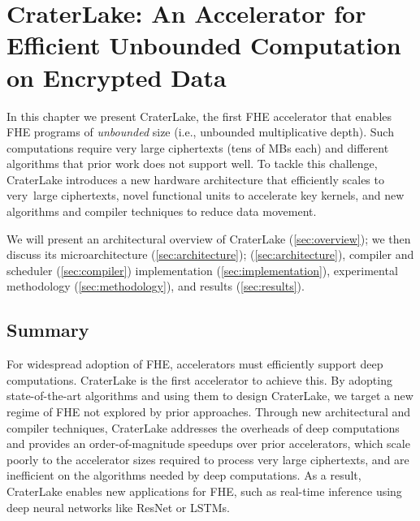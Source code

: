 \documentclass[12pt,twoside]{mitthesis}
\begin{document}
\chapter{CraterLake: An Accelerator for Efficient Unbounded Computation on Encrypted Data}\label{ch:craterlake}

In this chapter we present CraterLake, the first FHE accelerator that enables
FHE programs of \emph{unbounded} size (i.e., unbounded multiplicative depth).
Such computations require very large ciphertexts (tens of MBs each) and
different algorithms that prior work does not support well. To tackle this
challenge, CraterLake introduces a new hardware architecture that efficiently
scales to very~large ciphertexts, novel functional units to accelerate key
kernels, and new algorithms and compiler techniques to reduce data movement.

We will present an architectural overview of CraterLake
(\autoref{sec:overview}); we then discuss its microarchitecture
(\autoref{sec:architecture}); (\autoref{sec:architecture}), compiler and
scheduler (\autoref{sec:compiler}) implementation
(\autoref{sec:implementation}), experimental methodology
(\autoref{sec:methodology}), and results (\autoref{sec:results}).








\section{Summary}

For widespread adoption of FHE, accelerators must efficiently support deep
computations. CraterLake is the first accelerator to achieve this. By adopting
state-of-the-art algorithms and using them to design CraterLake, we target a
new regime of FHE not explored by prior approaches. Through new architectural
and compiler techniques, CraterLake addresses the overheads of deep
computations and provides an order-of-magnitude speedups over prior
accelerators, which scale poorly to the accelerator sizes required to process
very large ciphertexts, and are inefficient on the algorithms needed by deep
computations. As a result, CraterLake enables new applications for FHE, such as
real-time inference using deep neural networks like ResNet or LSTMs.




\begin{singlespacing}

\end{singlespacing}
\end{document}
